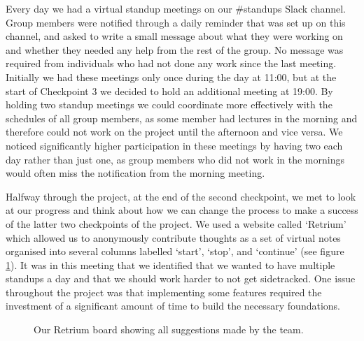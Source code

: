 Every day we had a virtual standup meetings on our \#standups Slack channel. Group members were notified through a daily reminder that was set up on this channel, and asked to write a small message about what they were working on and whether they needed any help from the rest of the group. No message was required from individuals who had not done any work since the last meeting. Initially we had these meetings only once during the day at 11:00, but at the start of Checkpoint 3 we decided to hold an additional meeting at 19:00. By holding two standup meetings we could coordinate more effectively with the schedules of all group members, as some member had lectures in the morning and therefore could not work on the project until the afternoon and vice versa. We noticed significantly higher participation in these meetings by having two each day rather than just one, as group members who did not work in the mornings would often miss the notification from the morning meeting.

Halfway through the project, at the end of the second checkpoint, we met to look at our progress and think about how we can change the process to make a success of the latter two checkpoints of the project. We used a website called `Retrium' which allowed us to anonymously contribute thoughts as a set of virtual notes organised into several columns labelled `start', `stop', and `continue' (see figure \ref{retrium}). It was in this meeting that we identified that we wanted to have multiple standups a day and that we should work harder to not get sidetracked. One issue throughout the project was that implementing some features required the investment of a significant amount of time to build the necessary foundations.

\begin{figure}[H]
\centering
{}
\caption{Our Retrium board showing all suggestions made by the team.}
\label{retrium}
\end{figure}

